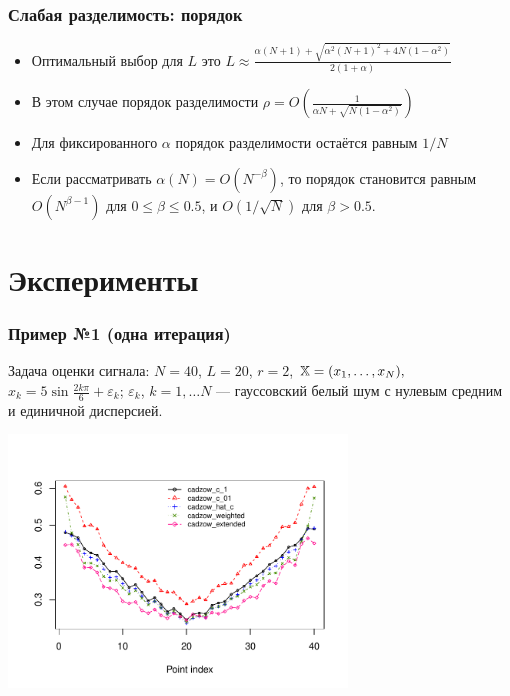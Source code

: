\documentclass[unicode, notheorems]{beamer}
\begin{document}
\begin{frame}
	\frametitle{Слабая разделимость: порядок}
	\begin{itemize}
		\item Оптимальный выбор для $L$ это $L \approx \frac{\alpha(N + 1) + \sqrt{\alpha^2(N+1)^2 + 4N(1  - \alpha^2)}}{2(1 + \alpha)}$
		\item В этом случае порядок разделимости $\rho = O \left(\frac{1}{\alpha N + \sqrt{N(1 - \alpha ^ 2)}} \right)$
		\item Для фиксированного $\alpha$ порядок разделимости остаётся равным $1/N$
		\item Если рассматривать $\alpha(N) = O(N^{-\beta})$, то порядок становится равным $O(N^{\beta - 1})$ для $0 \le \beta \le 0.5$, и $O(1/\sqrt{N})$ для $\beta > 0.5$.
	\end{itemize}
\end{frame}

 
\section{Эксперименты}
\begin{frame}
	\frametitle{Пример №1 (одна итерация)}
	Задача оценки сигнала: $N = 40$, $L = 20$, $r = 2$, $\mathbb{X} = (x_{1}, \ldots, x_N),$  $x_k = 5\sin{\frac{2 k \pi}{6}} + \varepsilon_k$; $\varepsilon_k$, $k = 1, \ldots N$ --- гауссовский белый шум с нулевым средним и единичной дисперсией.
	\vspace{-0.8cm}
	\begin{center}
		\includegraphics*[width = 9cm]{s1_it1.pdf}
	\end{center}
	
	
\end{frame}
\end{document}
